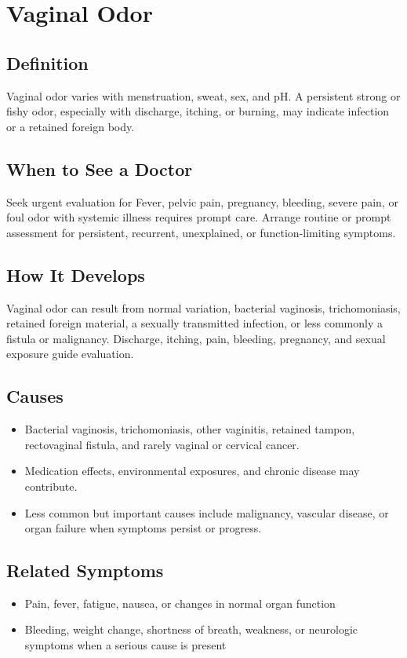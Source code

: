 \chapter{Vaginal Odor}

\section*{Definition}
Vaginal odor varies with menstruation, sweat, sex, and pH. A persistent strong or fishy odor, especially with discharge, itching, or burning, may indicate infection or a retained foreign body.

\section*{When to See a Doctor}
Seek urgent evaluation for Fever, pelvic pain, pregnancy, bleeding, severe pain, or foul odor with systemic illness requires prompt care. Arrange routine or prompt assessment for persistent, recurrent, unexplained, or function-limiting symptoms.

\section*{How It Develops}
Vaginal odor can result from normal variation, bacterial vaginosis, trichomoniasis, retained foreign material, a sexually transmitted infection, or less commonly a fistula or malignancy. Discharge, itching, pain, bleeding, pregnancy, and sexual exposure guide evaluation.

\section*{Causes}
\begin{itemize}
  \item Bacterial vaginosis, trichomoniasis, other vaginitis, retained tampon, rectovaginal fistula, and rarely vaginal or cervical cancer.
  \item Medication effects, environmental exposures, and chronic disease may contribute.
  \item Less common but important causes include malignancy, vascular disease, or organ failure when symptoms persist or progress.
\end{itemize}

\section*{Related Symptoms}
\begin{itemize}
  \item Pain, fever, fatigue, nausea, or changes in normal organ function
  \item Bleeding, weight change, shortness of breath, weakness, or neurologic symptoms when a serious cause is present
\end{itemize}

